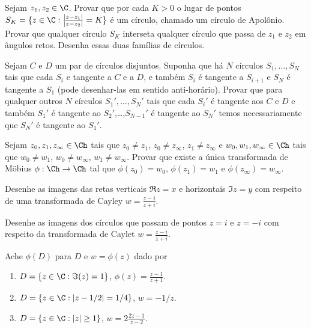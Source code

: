 \begin{problema}
Sejam $z_1,z_2\in\C$. Provar que por cada $K>0$ o lugar de pontos
$S_K = \{z \in \C: \frac{|z-z_1|}{|z-z_2|} = K \}$ é um círculo, chamado um círculo de Apolônio.
Provar que qualquer círculo $S_K$ interseta qualquer círculo que passa de $z_1$ e $z_2$ em ângulos retos.
Desenha essas duas famílias de círculos.
\end{problema}

\begin{problema}
Sejam $C$ e $D$ um par de círculos disjuntos. Suponha que há $N$ círculos
$S_1,\dots,S_N$ tais que cada $S_i$ e tangente a $C$ e a $D$,
e também $S_i$ é tangente a $S_{i+1}$ e $S_N$ é tangente a $S_1$ (pode desenhar-las em sentido anti-horário).
Provar que para qualquer outros $N$ círculos $S_1',\dots,S_N'$ tais que
cada $S_i'$ é tangente aos $C$ e $D$ e também $S_1'$ é tangente ao $S_2'$,\dots,$S_{N-1}'$ é tangente ao $S_N'$
temos necessariamente que $S_N'$ é tangente ao $S_1'$.
\end{problema}

\begin{problema}
Sejam 
$z_0,z_1,z_\infty \in\Ch$ tais que $z_0\neq z_1$, $z_0\neq z_\infty$, $z_1\neq z_\infty$
e 
$w_0,w_1,w_\infty \in\Ch$ tais que $w_0\neq w_1$, $w_0\neq w_\infty$, $w_1\neq w_\infty$.
Provar que existe a única transformada de Möbius $\phi : \Ch \to \Ch$ tal que
$\phi(z_0) = w_0$, $\phi(z_1) = w_1$ e $\phi(z_\infty) = w_\infty$.
\end{problema}

\begin{problema}
Desenhe as imagens das retas verticais $\Re z = x$ e horizontais $\Im z = y$
com respeito de uma transformada de Cayley $w = \frac{z-i}{z+i}$.
\end{problema}

\begin{problema}
Desenhe as imagens dos círculos que passam de pontos $z=i$ e $z=-i$ com respeito da transformada
de Caylet $w = \frac{z-i}{z+i}$.
\end{problema}

\begin{problema}
Ache $\phi(D)$ para $D$ e $w=\phi(z)$ dado por
\begin{enumerate}
\item $D = \{z\in\C: \Im(z) = 1\}$, $\phi(z) = \frac{z-1}{z+1}$.
\item $D = \{z\in\C: |z-1/2| = 1/4\}$, $w = -1/z$.
\item $D = \{z\in\C: |z|\geq 1 \}$, $w = 2 \frac{2z-1}{z-2}$.
\end{enumerate}
\end{problema}
